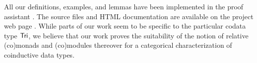 \documentclass{llncs}
\begin{document}
 All our definitions, examples, and lemmas have been implemented in the proof assistant \coq. %
 The \coq source files and HTML documentation are available on the project web page \parencite{trimat_coq}.
 While parts of our work seem to be specific to the particular codata type $\mathsf{Tri}$,
 we believe that our work proves the suitability of the notion of relative (co)monads and (co)modules thereover for 
 a categorical characterization of coinductive data types.


 


\renewcommand*{\bibfont}{\small}
\printbibliography[heading=none]
\end{document}
